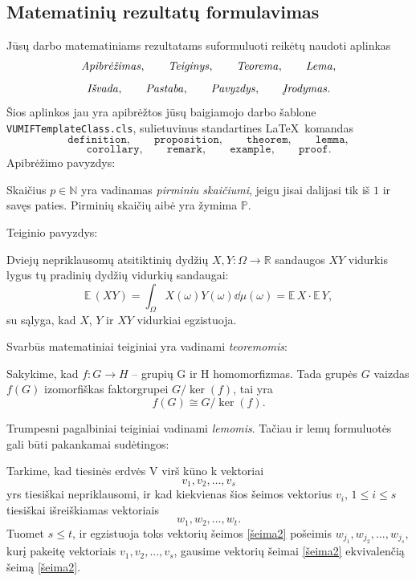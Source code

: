 \documentclass[]{VUMIFTemplateClass}
\newcommand{\EE}{\mathbb{E}\,} %
\begin{document}
\subsection{Matematinių rezultatų formulavimas}

Jūsų darbo matematiniams rezultatams suformuluoti reikėtų naudoti aplinkas
\[
\text{\emph{Apibrėžimas}},\qquad \text{\emph{Teiginys}}, \qquad \text{\emph{Teorema}}, \qquad \text{\emph{Lema}},
\]
\[
\text{\emph{Išvada}}, \qquad \text{\emph{Pastaba}}, \qquad  \text{\emph{Pavyzdys}}, \qquad \text{\emph{Įrodymas}}.
\]
Šios aplinkos jau yra apibrėžtos
jūsų baigiamojo darbo šablone \texttt{VUMIFTemplateClass.cls}, sulietuvinus standartines \LaTeX\  komandas
\[
\texttt{definition}, \qquad \texttt{proposition}, \qquad \texttt{theorem}, \qquad \texttt{lemma},
\]
\[
\texttt{corollary}, \qquad \texttt{remark}, \qquad \texttt{example}, \qquad \texttt{proof}.
\]
\noindent Apibrėžimo pavyzdys:
\begin{definition}
Skaičius $p \in \mathbb{N}$ yra vadinamas \emph{pirminiu skaičiumi}, jeigu jisai dalijasi tik iš $1$ ir savęs paties. Pirminių skaičių aibė yra žymima $\mathbb{P}$.
\end{definition}
\noindent Teiginio pavyzdys:
\begin{proposition}
Dviejų nepriklausomų atsitiktinių dydžių $X, Y: \Omega \to \mathbb{R}$ sandaugos $XY$ vidurkis lygus tų pradinių dydžių vidurkių sandaugai:
\[
\EE{(XY)}=\int_{\Omega} X(\omega)Y(\omega)\dd\mu(\omega) = \EE{X} \cdot \EE{Y},
\]
su sąlyga, kad $X$, $Y$ ir $XY$ vidurkiai egzistuoja.
\end{proposition}

\noindent  Svarbūs matematiniai teiginiai yra vadinami \emph{teoremomis}:
\begin{theorem}\label{teor1}
    Sakykime, kad $f: G {\rightarrow} H$ – grupių G ir H homomorfizmas. Tada grupės $G$ vaizdas $f(G)$ izomorfiškas faktorgrupei $G / \ker{(f)}$, tai yra
    \[
        f(G) \cong G \big / \ker{(f)}.
    \]
\end{theorem}

\noindent Trumpesni pagalbiniai teiginiai vadinami \emph{lemomis}. Tačiau ir lemų formuluotės gali būti pakankamai sudėtingos:
\begin{lemma}\label{lem1}
    Tarkime, kad tiesinės erdvės V virš kūno k vektoriai
    \begin{equation}\label{šeima1}
        v_1, v_2, \dots, v_s
    \end{equation}
    yrs tiesiškai nepriklausomi, ir kad kiekvienas šios šeimos vektorius $v_i$, $1 \leq i \leq s$ tiesiškai išreiškiamas vektoriais
    \begin{equation}\label{šeima2}
        w_1, w_2, \dots, w_t.
    \end{equation}
    Tuomet $s \leq t$, ir egzistuoja toks vektorių šeimos \eqref{šeima2} pošeimis $w_{j_1}, w_{j_2} ,  . . . , w_{j_s}$, kurį pakeitę vektoriais $v_1, v_2, . . . , v_s$, gausime vektorių šeimai \eqref{šeima2} ekvivalenčią šeimą \eqref{šeima2}.
\end{lemma}
\end{document}
